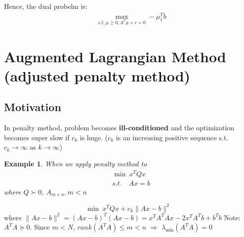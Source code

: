 \documentclass[11pt,a4paper]{article}
\newtheorem{example}{Example}
\begin{document}
Hence, the dual probelm is:
\begin{equation}
    \begin{aligned}
        &\max_{s.t.\ \mu\geq 0, A^T\mu+c=0}-\mu_1^Tb
    \end{aligned}
    \nonumber
\end{equation}
\begin{center}
\end{center}

\section{Augmented Lagrangian Method (adjusted penalty method)}
\subsection{Motivation}
In penalty method, problem becomes \textbf{ill-conditioned} and the optimization becomes super slow if $c_k$ is huge. (${c_k}$ is an increasing positive sequence s.t. $c_k \rightarrow\infty$ as $k\rightarrow\infty$)

\begin{example}
    When we apply penalty method to
    \begin{equation}
        \begin{aligned}
            &\min\ x^TQx\\
            &s.t.\quad Ax=b
        \end{aligned}
        \nonumber
    \end{equation}
    where $Q\succ 0$, $A_{m\times n},m<n$
\end{example}
$$\min\ x^TQx+c_k\|Ax-b\|^2$$
where $\|Ax-b\|^2=(Ax-b)^T(Ax-b)=x^TA^TAx-2x^TA^Tb+b^Tb$
Note: $A^TA\succeq 0$. Since $m<N$, $rank(A^TA)\leq m<n$ $\Rightarrow$ $\lambda_{\min}(A^TA)=0$
\end{document}
